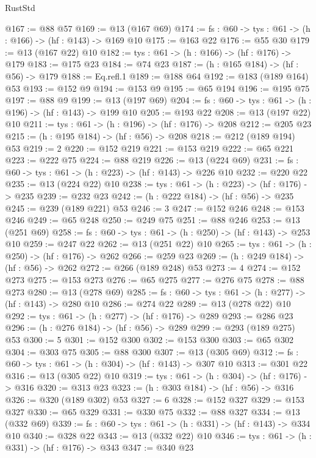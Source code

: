 \begin{lexlean}{RustStd}
\begin{coremodule}
@167 := @88 @57
@169 := @13 (@167 @69)
@174 := {fs : @60} -> {tys : @61} -> (h : @166) -> (hf : @143) -> @169 @10
@175 := @163 @22
@176 := @55 @30
@179 := @13 (@167 @22) @10
@182 := {tys : @61} -> (h : @166) -> (hf : @176) -> @179
@183 := @175 @23
@184 := @74 @23
@187 := (h : @165 @184) -> (hf : @56) -> @179
@188 := Eq.refl.{1}
@189 := @188 @64
@192 := @183 (@189 @164) @53
@193 := @152 @9
@194 := @153 @9
@195 := @65 @194
@196 := @195 @75
@197 := @88 @9
@199 := @13 (@197 @69)
@204 := {fs : @60} -> {tys : @61} -> (h : @196) -> (hf : @143) -> @199 @10
@205 := @193 @22
@208 := @13 (@197 @22) @10
@211 := {tys : @61} -> (h : @196) -> (hf : @176) -> @208
@212 := @205 @23
@215 := (h : @195 @184) -> (hf : @56) -> @208
@218 := @212 (@189 @194) @53
@219 := 2
@220 := @152 @219
@221 := @153 @219
@222 := @65 @221
@223 := @222 @75
@224 := @88 @219
@226 := @13 (@224 @69)
@231 := {fs : @60} -> {tys : @61} -> (h : @223) -> (hf : @143) -> @226 @10
@232 := @220 @22
@235 := @13 (@224 @22) @10
@238 := {tys : @61} -> (h : @223) -> (hf : @176) -> @235
@239 := @232 @23
@242 := (h : @222 @184) -> (hf : @56) -> @235
@245 := @239 (@189 @221) @53
@246 := 3
@247 := @152 @246
@248 := @153 @246
@249 := @65 @248
@250 := @249 @75
@251 := @88 @246
@253 := @13 (@251 @69)
@258 := {fs : @60} -> {tys : @61} -> (h : @250) -> (hf : @143) -> @253 @10
@259 := @247 @22
@262 := @13 (@251 @22) @10
@265 := {tys : @61} -> (h : @250) -> (hf : @176) -> @262
@266 := @259 @23
@269 := (h : @249 @184) -> (hf : @56) -> @262
@272 := @266 (@189 @248) @53
@273 := 4
@274 := @152 @273
@275 := @153 @273
@276 := @65 @275
@277 := @276 @75
@278 := @88 @273
@280 := @13 (@278 @69)
@285 := {fs : @60} -> {tys : @61} -> (h : @277) -> (hf : @143) -> @280 @10
@286 := @274 @22
@289 := @13 (@278 @22) @10
@292 := {tys : @61} -> (h : @277) -> (hf : @176) -> @289
@293 := @286 @23
@296 := (h : @276 @184) -> (hf : @56) -> @289
@299 := @293 (@189 @275) @53
@300 := 5
@301 := @152 @300
@302 := @153 @300
@303 := @65 @302
@304 := @303 @75
@305 := @88 @300
@307 := @13 (@305 @69)
@312 := {fs : @60} -> {tys : @61} -> (h : @304) -> (hf : @143) -> @307 @10
@313 := @301 @22
@316 := @13 (@305 @22) @10
@319 := {tys : @61} -> (h : @304) -> (hf : @176) -> @316
@320 := @313 @23
@323 := (h : @303 @184) -> (hf : @56) -> @316
@326 := @320 (@189 @302) @53
@327 := 6
@328 := @152 @327
@329 := @153 @327
@330 := @65 @329
@331 := @330 @75
@332 := @88 @327
@334 := @13 (@332 @69)
@339 := {fs : @60} -> {tys : @61} -> (h : @331) -> (hf : @143) -> @334 @10
@340 := @328 @22
@343 := @13 (@332 @22) @10
@346 := {tys : @61} -> (h : @331) -> (hf : @176) -> @343
@347 := @340 @23

\end{coremodule}
\end{lexlean}
